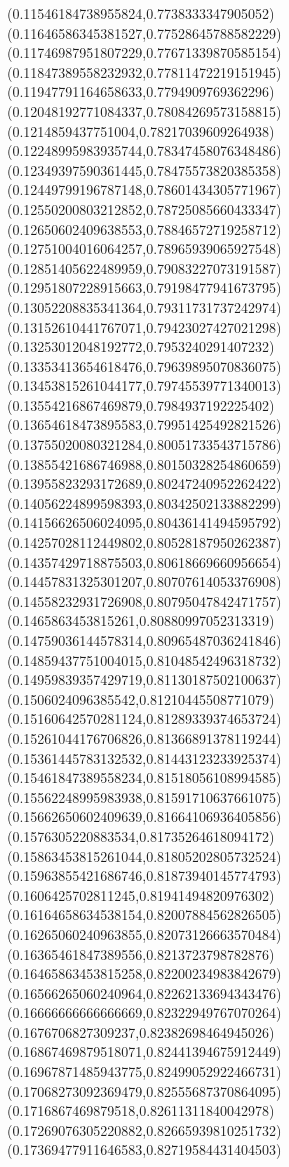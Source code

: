 \documentclass[12pt]{article}
\theoremstyle{plain}
\theoremstyle{definition}
\theoremstyle{remark}
\begin{document}
\begin{figure}
{  (0.11546184738955824,0.7738333347905052)%
  (0.11646586345381527,0.77528645788582229)%
  (0.11746987951807229,0.77671339870585154)%
  (0.11847389558232932,0.77811472219151945)%
  (0.11947791164658633,0.7794909769362296)%
  (0.12048192771084337,0.78084269573158815)%
  (0.1214859437751004,0.78217039609264938)%
  (0.12248995983935744,0.78347458076348486)%
  (0.12349397590361445,0.78475573820385358)%
  (0.12449799196787148,0.78601434305771967)%
  (0.12550200803212852,0.78725085660433347)%
  (0.12650602409638553,0.78846572719258712)%
  (0.12751004016064257,0.78965939065927548)%
  (0.12851405622489959,0.79083227073191587)%
  (0.12951807228915663,0.79198477941673795)%
  (0.13052208835341364,0.79311731737242974)%
  (0.13152610441767071,0.79423027427021298)%
  (0.13253012048192772,0.7953240291407232)%
  (0.13353413654618476,0.79639895070836075)%
  (0.13453815261044177,0.79745539771340013)%
  (0.13554216867469879,0.7984937192225402)%
  (0.13654618473895583,0.79951425492821526)%
  (0.13755020080321284,0.80051733543715786)%
  (0.13855421686746988,0.80150328254860659)%
  (0.13955823293172689,0.80247240952262422)%
  (0.14056224899598393,0.80342502133882299)%
  (0.14156626506024095,0.80436141494595792)%
  (0.14257028112449802,0.80528187950262387)%
  (0.14357429718875503,0.80618669660956654)%
  (0.14457831325301207,0.80707614053376908)%
  (0.14558232931726908,0.80795047842471757)%
  (0.1465863453815261,0.80880997052313319)%
  (0.14759036144578314,0.80965487036241846)%
  (0.14859437751004015,0.81048542496318732)%
  (0.14959839357429719,0.81130187502100637)%
  (0.1506024096385542,0.81210445508771079)%
  (0.15160642570281124,0.81289339374653724)%
  (0.15261044176706826,0.81366891378119244)%
  (0.15361445783132532,0.81443123233925374)%
  (0.15461847389558234,0.81518056108994585)%
  (0.15562248995983938,0.81591710637661075)%
  (0.15662650602409639,0.81664106936405856)%
  (0.1576305220883534,0.81735264618094172)%
  (0.15863453815261044,0.81805202805732524)%
  (0.15963855421686746,0.81873940145774793)%
  (0.1606425702811245,0.81941494820976302)%
  (0.16164658634538154,0.82007884562826505)%
  (0.16265060240963855,0.82073126663570484)%
  (0.16365461847389556,0.8213723798782876)%
  (0.16465863453815258,0.82200234983842679)%
  (0.16566265060240964,0.82262133694343476)%
  (0.16666666666666669,0.82322949767070264)%
  (0.1676706827309237,0.82382698464945026)%
  (0.16867469879518071,0.82441394675912449)%
  (0.16967871485943775,0.82499052922466731)%
  (0.17068273092369479,0.82555687370864095)%
  (0.1716867469879518,0.82611311840042978)%
  (0.17269076305220882,0.82665939810251732)%
  (0.17369477911646583,0.82719584431404503)%
}
\end{figure}
\end{document}
